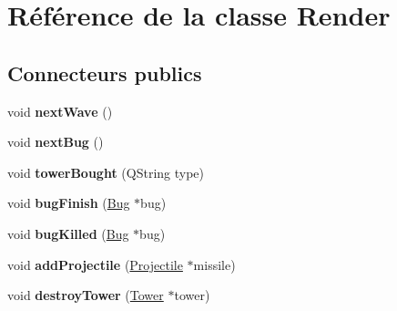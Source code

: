 \hypertarget{classRender}{
\section{Référence de la classe Render}
\label{classRender}
}
\subsection*{Connecteurs publics}
\begin{DoxyCompactItemize}
\item 
\hypertarget{classRender_a3252d02e9509f342bc96129b4b10b415}{
void {\bfseries nextWave} ()}
\label{classRender_a3252d02e9509f342bc96129b4b10b415}

\item 
\hypertarget{classRender_a9413625fc472b4b7806f3a0d615d6ea9}{
void {\bfseries nextBug} ()}
\label{classRender_a9413625fc472b4b7806f3a0d615d6ea9}

\item 
\hypertarget{classRender_a8e2eccb2fc3914198b8939bf0625c955}{
void {\bfseries towerBought} (QString type)}
\label{classRender_a8e2eccb2fc3914198b8939bf0625c955}

\item 
\hypertarget{classRender_aeeddbbe27102625cc2d5234fa0be523a}{
void {\bfseries bugFinish} (\hyperlink{classBug}{Bug} $\ast$bug)}
\label{classRender_aeeddbbe27102625cc2d5234fa0be523a}

\item 
\hypertarget{classRender_a940007358a139d0b30e002929d24f770}{
void {\bfseries bugKilled} (\hyperlink{classBug}{Bug} $\ast$bug)}
\label{classRender_a940007358a139d0b30e002929d24f770}

\item 
\hypertarget{classRender_a3b5bb3705131ca57252398e0f6a9e3e5}{
void {\bfseries addProjectile} (\hyperlink{classProjectile}{Projectile} $\ast$missile)}
\label{classRender_a3b5bb3705131ca57252398e0f6a9e3e5}

\item 
\hypertarget{classRender_a20678c257926bfff635fded745e11f4a}{
void {\bfseries destroyTower} (\hyperlink{classTower}{Tower} $\ast$tower)}
\label{classRender_a20678c257926bfff635fded745e11f4a}

\end{DoxyCompactItemize}
